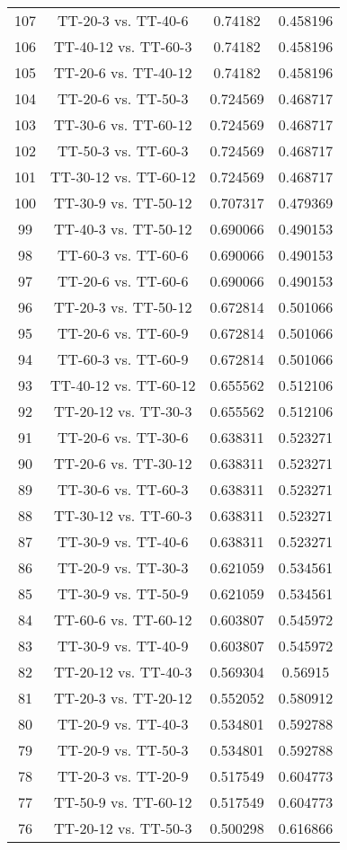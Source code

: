 \documentclass[a4paper,10pt]{article}
\begin{document}
\begin{landscape}
\begin{table}[!htp]
\begin{tabular}{cccc}
107&TT-20-3 vs. TT-40-6&0.74182&0.458196\\
106&TT-40-12 vs. TT-60-3&0.74182&0.458196\\
105&TT-20-6 vs. TT-40-12&0.74182&0.458196\\
104&TT-20-6 vs. TT-50-3&0.724569&0.468717\\
103&TT-30-6 vs. TT-60-12&0.724569&0.468717\\
102&TT-50-3 vs. TT-60-3&0.724569&0.468717\\
101&TT-30-12 vs. TT-60-12&0.724569&0.468717\\
100&TT-30-9 vs. TT-50-12&0.707317&0.479369\\
99&TT-40-3 vs. TT-50-12&0.690066&0.490153\\
98&TT-60-3 vs. TT-60-6&0.690066&0.490153\\
97&TT-20-6 vs. TT-60-6&0.690066&0.490153\\
96&TT-20-3 vs. TT-50-12&0.672814&0.501066\\
95&TT-20-6 vs. TT-60-9&0.672814&0.501066\\
94&TT-60-3 vs. TT-60-9&0.672814&0.501066\\
93&TT-40-12 vs. TT-60-12&0.655562&0.512106\\
92&TT-20-12 vs. TT-30-3&0.655562&0.512106\\
91&TT-20-6 vs. TT-30-6&0.638311&0.523271\\
90&TT-20-6 vs. TT-30-12&0.638311&0.523271\\
89&TT-30-6 vs. TT-60-3&0.638311&0.523271\\
88&TT-30-12 vs. TT-60-3&0.638311&0.523271\\
87&TT-30-9 vs. TT-40-6&0.638311&0.523271\\
86&TT-20-9 vs. TT-30-3&0.621059&0.534561\\
85&TT-30-9 vs. TT-50-9&0.621059&0.534561\\
84&TT-60-6 vs. TT-60-12&0.603807&0.545972\\
83&TT-30-9 vs. TT-40-9&0.603807&0.545972\\
82&TT-20-12 vs. TT-40-3&0.569304&0.56915\\
81&TT-20-3 vs. TT-20-12&0.552052&0.580912\\
80&TT-20-9 vs. TT-40-3&0.534801&0.592788\\
79&TT-20-9 vs. TT-50-3&0.534801&0.592788\\
78&TT-20-3 vs. TT-20-9&0.517549&0.604773\\
77&TT-50-9 vs. TT-60-12&0.517549&0.604773\\
76&TT-20-12 vs. TT-50-3&0.500298&0.616866\\

\end{tabular}
\end{table}
\end{landscape}
\end{document}
